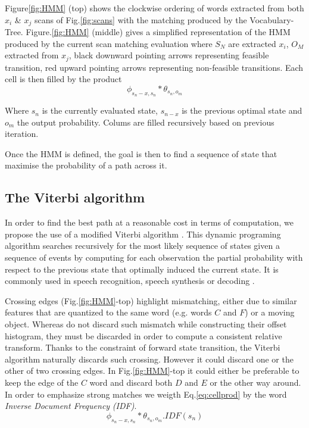 Figure\ref{fig:HMM} (top) shows the clockwise ordering of words extracted from both $x_i$ \& $x_j$ scans of Fig.\ref{fig:scans} with the matching produced by the Vocabulary-Tree.
Figure.\ref{fig:HMM} (middle) gives a simplified representation of the HMM produced by the current scan matching evaluation where $S_N$ are extracted $x_i$, $O_M$ extracted from $x_j$, black downward pointing arrows representing feasible transition, red upward pointing arrows representing non-feasible transitions. Each cell is then filled by the product
\begin{equation}
\label{eq:cellprod}
\phi_{s_n-x,s_n}*\theta_{s_n,o_m}
\end{equation}

Where $s_n$ is the currently evaluated state, $s_{n-x}$ is the previous optimal state and $o_m$ the output probability. Colums are filled recursively based on previous iteration.

Once the HMM is defined, the goal is then to find a sequence of state that maximise the probability of a path across it.

\subsection{The Viterbi algorithm}
\label{sec:viterbi}

In order to find the best path at a reasonable cost in terms of computation, we propose the use of a modified Viterbi algorithm \cite{Viterbi}. This dynamic programing algorithm searches recursively for the most likely sequence of states given a sequence of events by computing for each observation the partial probability with respect to the previous state that optimally induced the current state. It is commonly used in speech recognition, speech synthesis or decoding \cite{Rabiner} \cite{Shinghal}.

Crossing edges (Fig.\ref{fig:HMM}-top) highlight mismatching, either due to similar features that are quantized to the same word (e.g. words $C$ and $F$) or a moving object. Whereas \cite{TipaldiGFLIP} do not discard such mismatch while constructing their offset histogram, they must be discarded in order to compute a consistent relative transform. Thanks to the constraint of forward state transition, the Viterbi algorithm naturally discards such crossing. However it could discard one or the other of two crossing edges. In Fig.\ref{fig:HMM}-top it could either be preferable to keep the edge of the $C$ word and discard both $D$ and $E$ or the other way around. In order to emphasize strong matches we weigth Eq.\ref{eq:cellprod} by the word \textit{Inverse Document Frequency} \textit{(IDF)}. 
\begin{equation}
\label{eq:cellprodidf}
\phi_{s_n-x,s_n}*\theta_{s_n,o_m}.IDF(s_n)
\end{equation}

